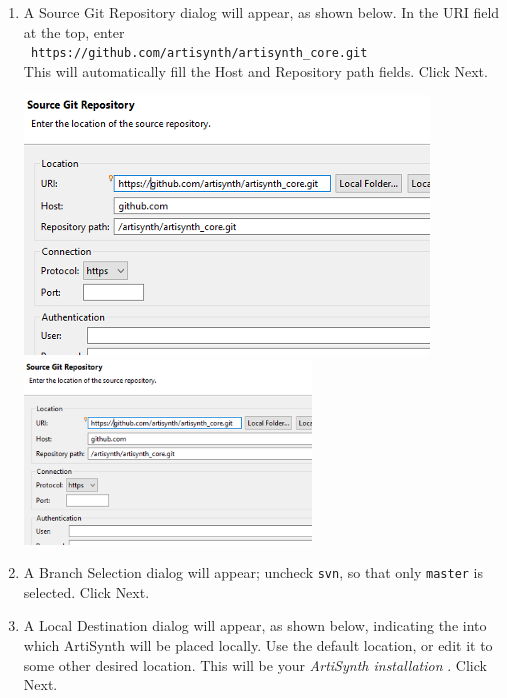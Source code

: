 \begin{enumerate}
\item A {\sf Source Git Repository} dialog will appear, as shown
below. In the {\sf URI} field at the top, enter\\{\tt
https://github.com/artisynth/artisynth\_core.git}\\This will
automatically fill the {\sf Host} and {\sf Repository path} fields.
Click {\sf Next}.

\begin{center}
\iflatexml
   \includegraphics[]{images/EclipseGitRepoDialog}
\else
   \includegraphics[width=0.6\textwidth]{images/EclipseGitRepoDialog}
\fi
\end{center}

\item A {\sf Branch Selection} dialog will appear; uncheck {\tt svn}, so
that only {\tt master} is selected. Click {\sf Next}. 

\item A {\sf Local Destination} dialog will appear, as shown below,
indicating the \directory{}into which ArtiSynth will be placed locally. Use
the default location, or edit it to some other desired location.  This
will be your {\it ArtiSynth installation \directory{}}.
Click {\sf Next}.


\end{enumerate}
